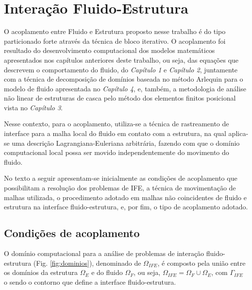 \documentclass[tese_patricia]{subfiles}
\begin{document}
\chapter[Acoplamento Fluido-Estrutura]{Interação Fluido-Estrutura} \label{capitulo:Cap7}

 O acoplamento entre Fluido e Estrutura proposto nesse trabalho é do tipo particionado forte através da técnica de bloco iterativo. O acoplamento foi resultado do desenvolvimento computacional dos modelos matemáticos apresentados nos capítulos anteriores deste trabalho, ou seja, das equações que descrevem o comportamento do fluido, do \textit{Capítulo 1} e \textit{Capítulo 2}, juntamente com a técnica de decomposição de domínios baseada no método Arlequin para o modelo de fluido apresentada no \textit{Capítulo 4}, e,  também, a metodologia de análise não linear de estruturas de casca pelo método dos elementos finitos posicional vista no \textit{Capítulo 3}.
 
 Nesse contexto, para o acoplamento, utiliza-se a técnica de rastreamento de interface para a malha local do fluido em contato com a estrutura, na qual aplica-se uma descrição Lagrangiana-Euleriana arbitrária, fazendo com que o domínio computacional local possa ser movido independentemente do movimento do fluido. 
 
 No texto a seguir apresentam-se inicialmente as condições de acoplamento que possibilitam a resolução dos problemas de IFE, a técnica de movimentação de malhas utilizada, o procedimento adotado em malhas não coincidentes de fluido e estrutura na interface fluido-estrutura, e, por fim, o tipo de acoplamento adotado.

\section{Condições de acoplamento}

O domínio computacional para a análise de problemas de interação fluido-estrutura (Fig. \ref{fig:dominios}), denominado de $\Omega_{IFE}$, é composto pela união entre os domínios da estrutura $\Omega_E$ e do fluido $\Omega_F$, ou seja, $\Omega_{IFE} = \Omega_F \cup \Omega_E$, com $\Gamma_{IFE}$ o sendo o contorno que define a interface fluido-estrutura.
\end{document}
